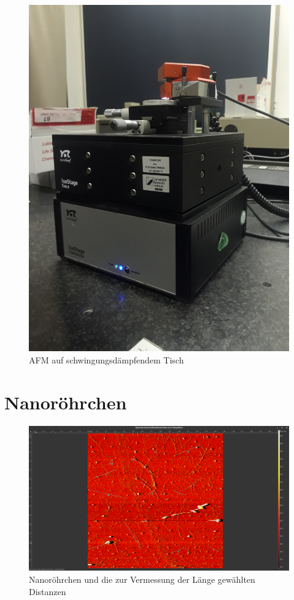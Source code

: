 \begin{figure}[h]
    \centering
    \includegraphics[width = \linewidth, angle = -90]{Bilder/Aufbau/20210920_093631.jpg}
    \caption{AFM auf schwingungsdämpfendem Tisch}
\end{figure}

\clearpage



\section{Nanoröhrchen}
\begin{figure}[h]
    \centering
    \includegraphics[width = \linewidth]{Bilder/Nanotubes/NanoTube15umLaenge2.png}
    \caption{Nanoröhrchen und die zur Vermessung der Länge gewählten Distanzen}
    \label{Nanotube20Mess}
\end{figure}

